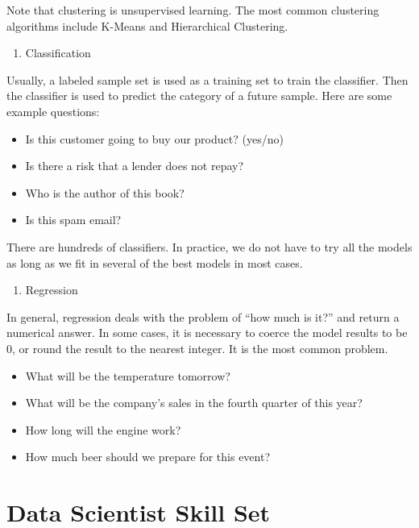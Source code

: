 \documentclass[12pt,]{krantz}
\providecommand{\tightlist}{%
  \setlength{\itemsep}{0pt}\setlength{\parskip}{0pt}}
\theoremstyle{definition}
\theoremstyle{definition}
\theoremstyle{definition}
\theoremstyle{remark}
\begin{document}
Note that clustering is unsupervised learning. The most common
clustering algorithms include K-Means and Hierarchical Clustering.

\begin{enumerate}
\def\labelenumi{\arabic{enumi}.}
\setcounter{enumi}{3}
\tightlist
\item
  Classification
\end{enumerate}

Usually, a labeled sample set is used as a training set to train the
classifier. Then the classifier is used to predict the category of a
future sample. Here are some example questions:

\begin{itemize}
\tightlist
\item
  Is this customer going to buy our product? (yes/no)
\item
  Is there a risk that a lender does not repay?
\item
  Who is the author of this book?
\item
  Is this spam email?
\end{itemize}

There are hundreds of classifiers. In practice, we do not have to try
all the models as long as we fit in several of the best models in most
cases.

\begin{enumerate}
\def\labelenumi{\arabic{enumi}.}
\setcounter{enumi}{4}
\tightlist
\item
  Regression
\end{enumerate}

In general, regression deals with the problem of ``how much is it?'' and
return a numerical answer. In some cases, it is necessary to coerce the
model results to be 0, or round the result to the nearest integer. It is
the most common problem.

\begin{itemize}
\tightlist
\item
  What will be the temperature tomorrow?
\item
  What will be the company's sales in the fourth quarter of this year?
\item
  How long will the engine work?
\item
  How much beer should we prepare for this event?
\end{itemize}

\section{Data Scientist Skill Set}\label{data-scientist-skill-set}
\end{document}
